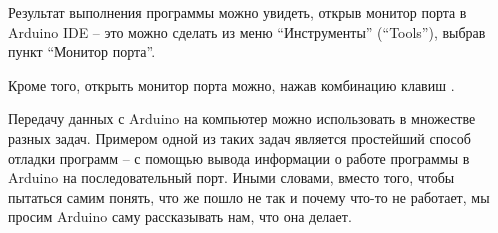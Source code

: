 \documentclass[../sparc.tex]{subfiles}
\begin{document}
Результат выполнения программы можно увидеть, открыв монитор порта в Arduino IDE
-- это можно сделать из меню ``Инструменты'' (``Tools''), выбрав пункт ``Монитор
порта''.

Кроме того, открыть монитор порта можно, нажав комбинацию клавиш .

Передачу данных с Arduino на компьютер можно использовать в множестве разных
задач. Примером одной из таких задач является простейший способ отладки программ
-- с помощью вывода информации о работе программы в Arduino на последовательный
порт. Иными словами, вместо того, чтобы пытаться самим понять, что же пошло не
так и почему что-то не работает, мы просим Arduino саму рассказывать нам, что
она делает.
\end{document}
